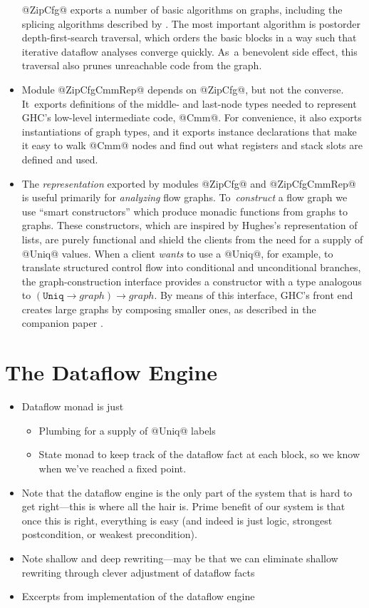 \documentclass[blockstyle,preprint,nocopyrightspace]{sigplanconf}
\newcommand\arrow{\rightarrow}
\let\cite\citep
\newcommand\seclabel[1]{\label{sec:#1}}
\begin{document}
\begin{itemize}
@ZipCfg@ exports a number of basic algorithms on graphs, including the
splicing algorithms described by
\citet{ramsey-dias:applicative-flow-graph}. 
The most important algorithm is postorder depth-first-search
traversal, which orders the basic blocks in a way such that iterative
dataflow analyses converge quickly.
As~a benevolent side effect, this traversal also prunes unreachable
code from the graph.
\item
Module @ZipCfgCmmRep@ depends on @ZipCfg@, but not the converse.
It~exports definitions of the middle- and last-node types needed to
represent GHC's low-level intermediate code, @Cmm@.
For convenience, it also exports instantiations of graph types,
and it exports instance declarations that make it easy to walk @Cmm@
nodes and find out what registers and stack slots are defined and
used.
\item
The \emph{representation} exported by
modules @ZipCfg@ and @ZipCfgCmmRep@ is useful primarily
for \emph{analyzing} flow graphs.
To~\emph{construct} a flow graph we use ``smart constructors'' which
produce monadic functions from graphs to graphs.
These constructors, which are inspired by Hughes's \citeyearpar{hughes:novel-lists}
representation of lists, are purely functional and shield the clients
from the need for a supply of @Uniq@ values.
When a client \emph{wants} to use a @Uniq@, for example, to translate
structured control flow into conditional and unconditional branches,
the graph-construction interface provides a constructor with a type
analogous to $(\mathtt{Uniq} \arrow \mathit{graph}) \arrow \mathit{graph}$.
By means of this interface, GHC's front end creates large graphs by
composing smaller ones, as described in the companion paper
\cite{dias-peyton:refactoring}. 
\end{itemize}




\section{The Dataflow Engine}
\seclabel{engine}

\begin{itemize}
\item
Dataflow monad is just
\begin{itemize}
\item
Plumbing for a supply of @Uniq@ labels
\item
State monad to keep track of the dataflow fact at each block, so we
know when we've reached a fixed point.
\end{itemize}
\item
Note that the dataflow engine is the only part of the system that is
hard to get right---this is where all the hair is.
Prime benefit of our system is that once this is right, everything is
easy (and indeed is just logic, strongest postcondition, or weakest
precondition). 
\item
Note shallow and deep rewriting---may be that we can eliminate shallow
rewriting through clever adjustment of dataflow facts
\item
Excerpts from implementation of the dataflow engine
\end{itemize}
\end{document}
